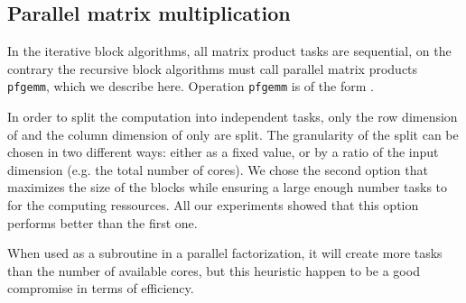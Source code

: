 \documentclass{article}
\newcommand{\pfgemm}{\texttt{pfgemm}\xspace}
\begin{document}
 



 
 
 


\subsection{Parallel matrix multiplication}

In the iterative block algorithms, all matrix product tasks are sequential, on
the contrary the recursive block algorithms must call parallel matrix products
\pfgemm, which we describe here. Operation \pfgemm is of the form 
.
 
 
 
 
 
 
 
 
 
 
 
 
 
 
 
 
 
 
In order to split the computation into independent tasks, only the row
dimension of  and the column dimension of  only are split. 
The granularity of the split can be chosen in two different ways: either as a
fixed value, or by a ratio of the input dimension (e.g. the total number of
cores).
We chose the second option that maximizes the size of the blocks while ensuring
a large enough number tasks to for the computing ressources. All our experiments
showed that this option performs better than the first one. 
 
When used as a subroutine in a parallel factorization, it will create more tasks
than the number of available cores, but this heuristic happen to be a good
compromise in terms of efficiency. 

 
 
 
 
 
 
 
 
 
 
 
 
 
 
 
 
    
 
 
 
 
 
 
 
 
 
 
 
 
 
 
 

 
 
\end{document}
